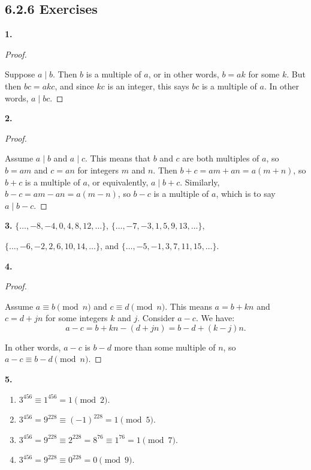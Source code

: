 \documentclass[10pt,]{book}
\theoremstyle{plain}
\theoremstyle{definition}
\theoremstyle{definition}
\theoremstyle{definition}
\numberwithin{equation}{chapter}
\begin{document}
\subsection*{6.2.6 Exercises}
\noindent\textbf{1.}\quad{}\begin{proof}\hypertarget{proof-64}{}

Suppose \(a \mid b\). Then \(b\) is a multiple of \(a\), or in other words, \(b = ak\) for some \(k\). But then \(bc = akc\), and since \(kc\) is an integer, this says \(bc\) is a multiple of \(a\). In other words, \(a \mid bc\).
%
\end{proof}
\par\smallskip
\noindent\textbf{2.}\quad{}\begin{proof}\hypertarget{proof-65}{}

Assume \(a \mid b\) and \(a \mid c\). This means that \(b\) and \(c\) are both multiples of \(a\), so \(b = am\) and \(c = an\) for integers \(m\) and \(n\). Then \(b+c = am+an = a(m+n)\), so \(b+c\) is a multiple of \(a\), or equivalently, \(a \mid b+c\). Similarly, \(b-c = am-an = a(m-n)\), so \(b-c\) is a multiple of \(a\), which is to say \(a \mid b-c\).
%
\end{proof}
\par\smallskip
\noindent\textbf{3.}\quad{}
\(\{\ldots, -8, -4, 0, 4, 8, 12, \ldots\}\), \(\{\ldots, -7, -3, 1, 5, 9, 13, \ldots\}\), %
\par
\(\{\ldots, -6, -2, 2, 6, 10, 14, \ldots\}\),
and \(\{\ldots, -5, -1, 3, 7, 11, 15, \ldots\}\).
%
\par\smallskip
\noindent\textbf{4.}\quad{}\begin{proof}\hypertarget{proof-66}{}

Assume \(a \equiv b \pmod n\) and \(c \equiv d \pmod n\). This means \(a = b + kn\) and \(c = d + jn\) for some integers \(k\) and \(j\). Consider \(a-c\). We have:
\begin{equation*}
  a-c = b+kn - (d+jn) = b-d + (k-j)n.
\end{equation*}
%
\par

In other words, \(a-c\) is \(b-d\) more than some multiple of \(n\), so \(a-c \equiv b-d \pmod n\).
%
\end{proof}
\par\smallskip
\noindent\textbf{5.}\quad{}\leavevmode%
\begin{enumerate}[label=(\alph*)]
\item\hypertarget{li-1413}{}\(3^{456} \equiv 1^{456} = 1 \pmod 2\).%
\item\hypertarget{li-1414}{}\(3^{456} = 9^{228} \equiv (-1)^{228} = 1 \pmod{5}\).%
\item\hypertarget{li-1415}{}\(3^{456} = 9^{228} \equiv 2^{228} = 8^{76} \equiv 1^{76} = 1 \pmod 7\).%
\item\hypertarget{li-1416}{}\(3^{456} = 9^{228} \equiv 0^{228} = 0 \pmod{9}\).%
\end{enumerate}
\end{document}
